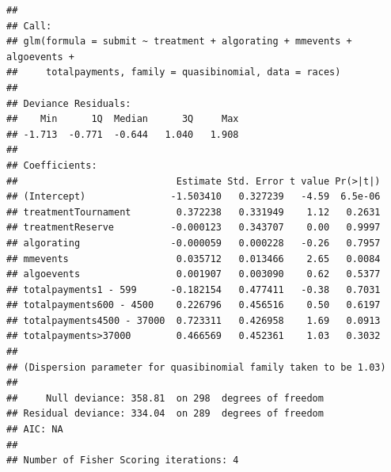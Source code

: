 \documentclass[12pt,]{article}
\begin{document}
\begin{verbatim}
## 
## Call:
## glm(formula = submit ~ treatment + algorating + mmevents + algoevents + 
##     totalpayments, family = quasibinomial, data = races)
## 
## Deviance Residuals: 
##    Min      1Q  Median      3Q     Max  
## -1.713  -0.771  -0.644   1.040   1.908  
## 
## Coefficients:
##                            Estimate Std. Error t value Pr(>|t|)
## (Intercept)               -1.503410   0.327239   -4.59  6.5e-06
## treatmentTournament        0.372238   0.331949    1.12   0.2631
## treatmentReserve          -0.000123   0.343707    0.00   0.9997
## algorating                -0.000059   0.000228   -0.26   0.7957
## mmevents                   0.035712   0.013466    2.65   0.0084
## algoevents                 0.001907   0.003090    0.62   0.5377
## totalpayments1 - 599      -0.182154   0.477411   -0.38   0.7031
## totalpayments600 - 4500    0.226796   0.456516    0.50   0.6197
## totalpayments4500 - 37000  0.723311   0.426958    1.69   0.0913
## totalpayments>37000        0.466569   0.452361    1.03   0.3032
## 
## (Dispersion parameter for quasibinomial family taken to be 1.03)
## 
##     Null deviance: 358.81  on 298  degrees of freedom
## Residual deviance: 334.04  on 289  degrees of freedom
## AIC: NA
## 
## Number of Fisher Scoring iterations: 4
\end{verbatim}
\end{document}
